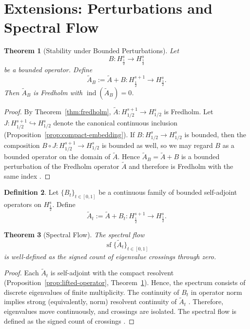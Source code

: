 \documentclass[11pt]{amsart}
\newtheorem{theorem}{Theorem}[section]
\theoremstyle{definition}
\newtheorem{definition}[theorem]{Definition}
\theoremstyle{remark}
\begin{document}
\section{Extensions: Perturbations and Spectral Flow}
\label{sec:extensions}

\begin{theorem}[Stability under Bounded Perturbations]
\label{thm:stability}
Let
\[
B : H^s_{\frac{1}{2}} \longrightarrow H^s_{\frac{1}{2}}
\]
be a bounded operator. Define
\[
\widetilde{A}_B := \widetilde{A} + B : H^{s+1}_{\frac{1}{2}} \to H^s_{\frac{1}{2}}.
\]
Then $\widetilde{A}_B$ is Fredholm with $\operatorname{ind}(\widetilde{A}_B) = 0$.
\end{theorem}

\begin{proof}
By Theorem~\ref{thm:fredholm}, $\widetilde{A}: H^{s+1}_{1/2}\to H^s_{1/2}$ is Fredholm.
Let $J: H^{s+1}_{1/2}\hookrightarrow H^s_{1/2}$ denote the canonical continuous inclusion (Proposition~\ref{prop:compact-embedding}). If
$B:H^s_{1/2}\to H^s_{1/2}$ is bounded, then the composition $B\circ J: H^{s+1}_{1/2}\to H^s_{1/2}$ is bounded as well, so we may regard $B$ as a bounded operator on the domain of $\widetilde{A}$. Hence $\widetilde{A}_B=\widetilde{A} + B$ is a bounded perturbation of the Fredholm operator $\widetilde{A}$ and therefore is Fredholm with the same index \cite{hormander}.
\end{proof}


\begin{definition}
Let $\{B_t\}_{t \in [0,1]}$ be a continuous family of bounded self-adjoint operators on $H^s_{\frac{1}{2}}$. Define
\[
\widetilde{A}_t := \widetilde{A} + B_t : H^{s+1}_{\frac{1}{2}} \to H^s_{\frac{1}{2}}.
\]
\end{definition}

\begin{theorem}[Spectral Flow]
\label{thm:spectral-flow}
The spectral flow
\[
\operatorname{sf}\{\widetilde{A}_t\}_{t \in [0,1]}
\]
is well-defined as the signed count of eigenvalue crossings through zero.
\end{theorem}

\begin{proof}
Each $\widetilde{A}_t$ is self-adjoint with the compact resolvent (Proposition~\ref{prop:lifted-operator}, Theorem~\ref{thm:stability}). Hence, the spectrum consists of discrete eigenvalues of finite multiplicity. The continuity of $B_t$ in operator norm implies strong (equivalently, norm) resolvent continuity of $\widetilde{A}_t$ \cite{kato}. Therefore, eigenvalues move continuously, and crossings are isolated. The spectral flow is defined as the signed count of crossings \cite{boo-bavnbek-wojciechowski}.
\end{proof}
\end{document}
